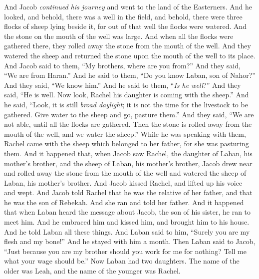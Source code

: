 \begin{biblechapter} %
 And Jacob \textit{continued his journey} and went to the land of the Easterners.
\verse And he looked, and behold, there was a well in the field, and behold, there were three flocks of sheep lying beside it, for out of that well the flocks were watered. And the stone on the mouth of the well was large.
\verse And when all the flocks were gathered there, they rolled away the stone from the mouth of the well. And they watered the sheep and returned the stone upon the mouth of the well to its place.
\verse And Jacob said to them, “My brothers, where are you from?” And they said, “We are from Haran.”
\verse And he said to them, “Do you know Laban, son of Nahor?” And they said, “We know him.”
\verse And he said to them, “\textit{Is he well}?” And they said, “He is well. Now look, Rachel his daughter is coming with the sheep.”
\verse And he said, “Look, it is still \textit{broad daylight}; it is not the time for the livestock to be gathered. Give water to the sheep and go, pasture them.”
\verse And they said, “We are not able, until all the flocks are gathered. Then the stone is rolled away from the mouth of the well, and we water the sheep.”
\verse While he was speaking with them, Rachel came with the sheep which belonged to her father, for she was pasturing them.
\verse And it happened that, when Jacob saw Rachel, the daughter of Laban, his mother’s brother, and the sheep of Laban, his mother’s brother, Jacob drew near and rolled away the stone from the mouth of the well and watered the sheep of Laban, his mother’s brother.
\verse And Jacob kissed Rachel, and lifted up his voice and wept.
\verse And Jacob told Rachel that he was the relative of her father, and that he was the son of Rebekah. And she ran and told her father.
\verse And it happened that when Laban heard the message about Jacob, the son of his sister, he ran to meet him. And he embraced him and kissed him, and brought him to his house. And he told Laban all these things.
\verse And Laban said to him, “Surely you are my flesh and my bone!” And he stayed with him a month.
 Then Laban said to Jacob, “Just because you are my brother should you work for me for nothing? Tell me what your wage should be.”
\verse Now Laban had two daughters. The name of the older was Leah, and the name of the younger was Rachel.

\end{biblechapter}
